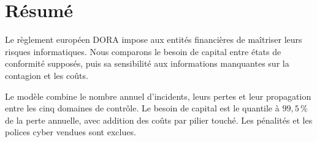 ﻿%

\chapter*{Résumé}

Le règlement européen DORA impose aux entités financières de maîtriser leurs risques informatiques.
Nous comparons le besoin de capital entre états de conformité supposés, puis sa sensibilité
aux informations manquantes sur la contagion et les coûts.

Le modèle combine le nombre annuel d'incidents, leurs pertes et leur propagation entre les cinq
domaines de contrôle. Le besoin de capital est le quantile à $99{,}5\,\%$ de la perte annuelle,
avec addition des coûts par pilier touché. Les pénalités et les polices cyber vendues sont exclues.

